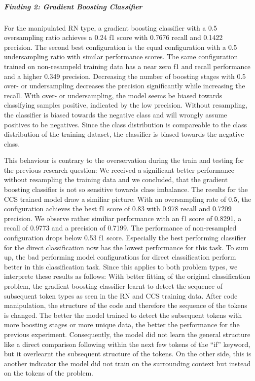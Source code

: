 \subparagraph{Finding 2: Gradient Boosting Classifier}
For the manipulated RN type, a gradient boosting classifier with a 0.5 oversampling ratio achieves a 0.24 f1 score with 0.7676 recall and 0.1422 precision. The second best configuration is the equal configuration with a 0.5 undersampling ratio with similar performance scores. The same configuration trained on non-resampeld training data has a near zero f1 and recall performance and a higher 0.349 precision. Decreasing the number of boosting stages with 0.5 over- or undersampling decreases the precision significantly while increasing the recall.
With over- or undersampling, the model seems be biased towards classifying samples positive, indicated by the low precision. Without resampling, the classifier is biased towards the negative class and will wrongly assume positives to be negatives. Since the class distribution is compareable to the class distribution of the training dataset, the classifier is biased towards the negative class.

This behaviour is contrary to the overservation during the train and testing for the previous research question:  We received a significant better performance without resampling the training data and we concluded, that the gradient boosting classifier is not so sensitive towards class imbalance. 
The results for the CCS trained model draw a similiar picture: With an oversampling rate of 0.5, the configuration achieves the best f1 score of 0.83 with 0.978 recall and 0.7209 precision. We observe rather similiar performance with an f1 score of 0.8291, a recall of 0.9773 and a precision of 0.7199. The performance of non-resampled configuration drops below 0.53 f1 score. Especially the best performing classifier for the direct classification now has the lowest performance for this task. To sum up, the bad performing model configurations for direct classification perform better in this classification task. Since this applies to both problem types, we interprete these results as follows: With better fitting of the original classification problem, the gradient boosting classifier learnt to detect the sequence of subsequent token types as seen in the RN and CCS training data. After code manipulation, the structure of the code and therefore the sequence of the tokens is changed. The better the model trained to detect the subsequent tokens with more boosting stages or more unique data, the better the performance for the previous experiment. Consequently, the model did not learn the general structure like a direct comparison following within the next few tokens of the \enquote{if} keyword, but it overlearnt the subsequent structure of the tokens. On the other side, this is another indicator the model did not train on the surrounding context but instead on the tokens of the problem.

